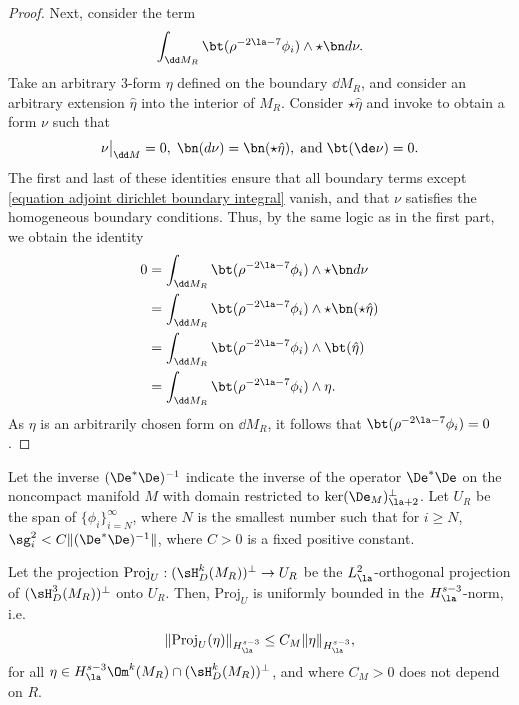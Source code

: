 \documentclass[hidelinks, 12pt, oneside, reqno]{amsart}
\begin{document}
\begin{proof}
    Next, consider the term
    \begin{equation}\label{equation adjoint dirichlet boundary integral}
    \int_{\dd M_R} \bt (\rho^{-2\la- 7} \phi_i) \wedge \star \bn d \nu.
    \end{equation}
    Take an arbitrary 3-form $\eta$ defined on the boundary $\dd M_R$, and consider an arbitrary extension $\hat \eta$ into the interior of $M_R$. Consider $\star \hat \eta$ and invoke \cite[Lemma 3.3.2]{HodgeDecompSchwarz} to obtain a form $\nu$ such that 
    \[
    \nu \big|_{\dd M} = 0, \; \bn (d \nu) = \bn (\star \hat \eta), \; \text{and}\; \bt(\de \nu) = 0.  
    \]
    The first and last of these identities ensure that all boundary terms except \eqref{equation adjoint dirichlet boundary integral} vanish, and that $\nu$ satisfies the homogeneous boundary conditions. Thus, by the same logic as in the first part, we obtain the identity
    \begin{align*}
        0 &= \int_{\dd M_R} \bt (\rho^{-2\la- 7} \phi_i) \wedge \star \bn d \nu \\
        &= \int_{\dd M_R} \bt (\rho^{-2\la- 7} \phi_i) \wedge \star \bn (\star \hat \eta) \\
        &=\int_{\dd M_R} \bt (\rho^{-2\la- 7} \phi_i) \wedge \bt (\hat \eta) \\
        &=\int_{\dd M_R} \bt (\rho^{-2\la- 7} \phi_i) \wedge \eta.
    \end{align*}
    As $\eta$ is an arbitrarily chosen form on $\dd M_R$, it follows that $\bt (\rho^{-2\la- 7} \phi_i) = 0$.
\end{proof}

\begin{prop}\label{proposition uniform boundedness of projection} 
    Let the inverse $(\De^*\De)^{-1}$ indicate the inverse of the operator $\De^*\De$ on the noncompact manifold $M$ with domain restricted to $\ker(\De_M)^\perp_{\la+2}$. Let $U_R$ be the  span of $\{\phi_i\}_{i= N}^\infty$, where $N$ is the smallest number such that for $i \ge N$,  $\sg_i^2 < C \|(\De^*\De)^{-1}\|$, where $C>0$ is a fixed positive constant. 
    
    Let the projection $\mathrm{Proj}_{U}: (\sH^k_D(M_R))^\perp \rightarrow U_R$ be the $L^2_{\la}$-orthogonal projection of $(\sH^3_D(M_R))^\perp$ onto $U_R$. Then, $\mathrm{Proj}_{U}$ is uniformly bounded in the $H^{s-3}_{\la}$-norm, i.e.
    \[
    \|\mathrm{Proj}_{U}(\eta)\|_{H^{s-3}_\la} \le C_M \|\eta\|_{H^{s-3}_\la},
    \]
    for all $\eta \in H^{s-3}_{\la}\Om^k(M_R) \cap (\sH^k_D(M_R))^\perp$, and where $C_M > 0$ does not depend on $R$.
\end{prop}
\end{document}
